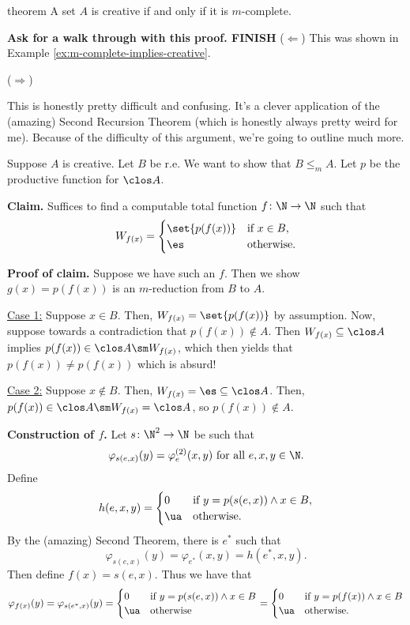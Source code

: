 \documentclass[class=article, crop=false]{standalone}
\begin{document}
\begin{result}{theorem}
  A set $A$ is creative if and only if it is $m$-complete.
\end{result}
\begin{pf}
  \textbf{Ask for a walk through with this proof. FINISH}
  ($\Leftarrow$) This was shown in Example \ref{ex:m-complete-implies-creative}.

  ($\Rightarrow$)

  \begin{rem}
    This is honestly pretty difficult and confusing. It's a clever application of the (amazing) Second Recursion Theorem (which is honestly always pretty weird for me). Because of the difficulty of this argument, we're going to outline much more.
  \end{rem}

  Suppose $A$ is creative. Let $B$ be r.e. We want to show that $B \leq_m A$. Let $p$ be the productive function for $\clos A$.

  \textbf{Claim.} Suffices to find a computable total function $f\colon \N \to \N$ such that
    \[
      W_{f(x)} =
        \begin{cases}
          \set{p(f(x))} & \text{if } x\in B, \\
          \es & \text{otherwise}.
        \end{cases}
    \]

  \textbf{Proof of claim.} Suppose we have such an $f$. Then we show $g(x) = p(f(x))$ is an $m$-reduction from $B$ to $A$.

  \underline{Case 1:} Suppose $x \in B$. Then, $W_{f(x)} = \set{p(f(x))}$ by assumption. Now, suppose towards a contradiction that $p(f(x)) \nin A$. Then $W_{f(x)} \subseteq \clos A$ implies $p(f(x)) \in \clos A \sm W_{f(x)}$, which then yields that $p(f(x)) \neq p(f(x))$ which is absurd!

  \underline{Case 2:} Suppose $x \nin B$. Then, $W_{f(x)} = \es \subseteq \clos A$. Then, $p(f(x)) \in \clos A \sm W_{f(x)} = \clos A$, so $p(f(x)) \nin A$.


  \textbf{Construction of $f$.} Let $s\colon \N^2\to \N$ be such that
    \[
      \varphi_{s(e,x)}(y) = \varphi_e^{(2)}(x,y) \text{ for all } e,x,y \in \N.
    \]
  Define
    \[
      h(e,x,y) =
        \begin{cases}
          0 & \text{if } y = p(s(e,x)) \land x \in B, \\
          \ua & \text{otherwise}.
        \end{cases}
    \]
  By the (amazing) Second Theorem, there is $e^*$ such that
    \[
      \varphi_{s(e,x)}(y) = \varphi_{e^*}(x,y) = h(e^*,x,y).
    \]
  Then define $f(x) = s(e,x)$. Thus we have that
    \[
      \varphi_{f(x)}(y) = \varphi_{s(e^*,x)}(y) =
      \begin{cases}
        0 & \text{if } y = p(s(e,x)) \land x \in B \\
        \ua & \text{otherwise}
      \end{cases} =
      \begin{cases}
        0 & \text{if } y = p(f(x)) \land x \in B \\
        \ua & \text{otherwise}.
      \end{cases}
    \]
\end{pf}
\end{document}
